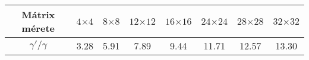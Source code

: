 \begin{tabular}{|c||c|c|c|c|c|c|c|}
	\hline
	Mátrix mérete &$4{\times4}$&$8{\times8}$&$12{\times12}$&$16{\times16}$&$24{\times24}$&$28{\times28}$&$32{\times32}$ \\
	\hline
	$\gamma'/\gamma$ &3.28&5.91&7.89&9.44&11.71&12.57&13.30 \\
	\hline
\end{tabular}